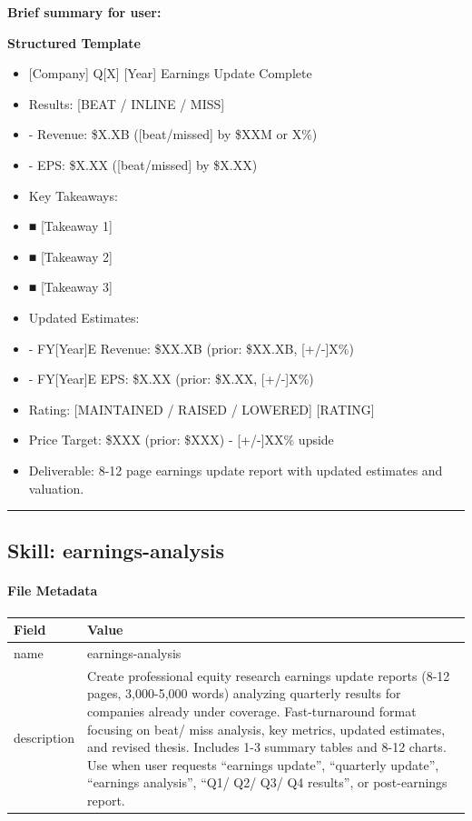 \documentclass[11pt]{article}
\begin{document}
\textbf{Brief summary for user:}

\textbf{Structured Template}
\begin{itemize}[leftmargin=*,itemsep=2pt,topsep=2pt]
\item {} [Company] Q[X] [Year] Earnings Update Complete
\item {} Results: [BEAT / INLINE / MISS]
\item {} - Revenue: \$X.XB ([beat/missed] by \$XXM or X\%)
\item {} - EPS: \$X.XX ([beat/missed] by \$X.XX)
\item {} Key Takeaways:
\item {} ■ [Takeaway 1]
\item {} ■ [Takeaway 2]
\item {} ■ [Takeaway 3]
\item {} Updated Estimates:
\item {} - FY[Year]E Revenue: \$XX.XB (prior: \$XX.XB, [+/-]X\%)
\item {} - FY[Year]E EPS: \$X.XX (prior: \$X.XX, [+/-]X\%)
\item {} Rating: [MAINTAINED / RAISED / LOWERED] [RATING]
\item {} Price Target: \$XXX (prior: \$XXX) - [+/-]XX\% upside
\item {} Deliverable: 8-12 page earnings update report with updated estimates and valuation.
\end{itemize}

\vspace{0.8em}\hrule\vspace{0.8em}

\subsection{Skill: earnings-analysis}\label{file:earnings-reviewer-skills-earnings-analysis-SKILL-md}

\paragraph{File Metadata}\mbox{}\par
\begingroup
\small
\setlength{\tabcolsep}{2pt}
\begin{longtable}{>{\RaggedRight\arraybackslash\hspace{0pt}}p{}>{\RaggedRight\arraybackslash\hspace{0pt}}p{}}
\toprule
{} \textbf{Field} & \textbf{Value} \\
\midrule
{} name & earnings-analysis \\
{} description & Create professional equity research earnings update reports (8-12 pages, 3,000-5,000 words) analyzing quarterly results for companies already under coverage. Fast-turnaround format focusing on beat/ miss analysis, key metrics, updated estimates, and revised thesis. Includes 1-3 summary tables and 8-12 charts. Use when user requests ``earnings update'', ``quarterly update'', ``earnings analysis'', ``Q1/ Q2/ Q3/ Q4 results'', or post-earnings report. \\
\bottomrule
\end{longtable}
\endgroup
\end{document}
